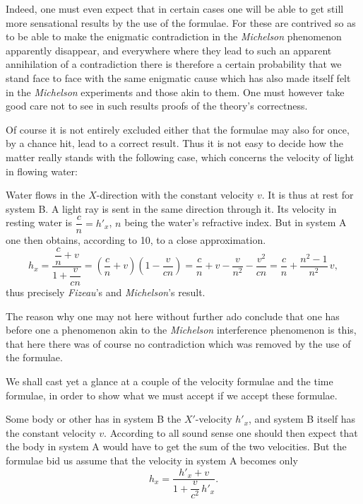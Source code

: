 \documentclass[12pt,a4paper]{article}
\begin{document}
Indeed, one must even expect that in certain cases one will be able to get
still more sensational results by the use of the formulae. For these are
contrived so as to be able to make the enigmatic contradiction in the
\emph{Michelson} phenomenon apparently disappear, and everywhere where they
lead to such an apparent annihilation of a contradiction there is therefore a
certain probability that we stand face to face with the same enigmatic cause
which has also made itself felt in the \emph{Michelson} experiments and those
akin to them. One must however take good care not to see in such results
proofs of the theory's correctness.

Of course it is not entirely excluded either that the formulae may also for
once, by a chance hit, lead to a correct result. Thus it is not easy to decide
how the matter really stands with the following case, which concerns the
velocity of light in flowing water:

Water flows in the $X$-direction with the constant velocity $v$. It is thus at
rest for system B. A light ray is sent in the same direction through it. Its
velocity in resting water is $\dfrac{c}{n} = h'_{x}$, $n$ being the water's
refractive index. But in system A one then obtains, according to 10, to a
close approximation.
\[
  h_{x} = \frac{\dfrac{c}{n} + v}{1 + \dfrac{v}{cn}}
        = \left(\frac{c}{n} + v\right)\left(1 - \frac{v}{cn}\right)
        = \frac{c}{n} + v - \frac{v}{n^{2}} - \frac{v^{2}}{cn}
        = \frac{c}{n} + \frac{n^{2} - 1}{n^{2}}\,v,
\]
thus precisely \emph{Fizeau}'s and \emph{Michelson}'s result.

The reason why one may not here without further ado conclude that one has
before one a phenomenon akin to the \emph{Michelson} interference phenomenon
is this, that here there was of course no contradiction which was removed by
the use of the formulae.

We shall cast yet a glance at a couple of the velocity formulae and the time
formulae, in order to show what we must accept if we accept these formulae.

Some body or other has in system B the $X'$-velocity $h'_{x}$, and system B
itself has the constant velocity $v$. According to all sound sense one should
then expect that the body in system A would have to get the sum
of the two velocities. But the formulae bid us assume that the velocity in
system A becomes only
\[
  h_{x} = \frac{h'_{x} + v}{1 + \dfrac{v}{c^{2}}\,h'_{x}}.
\]
\end{document}
